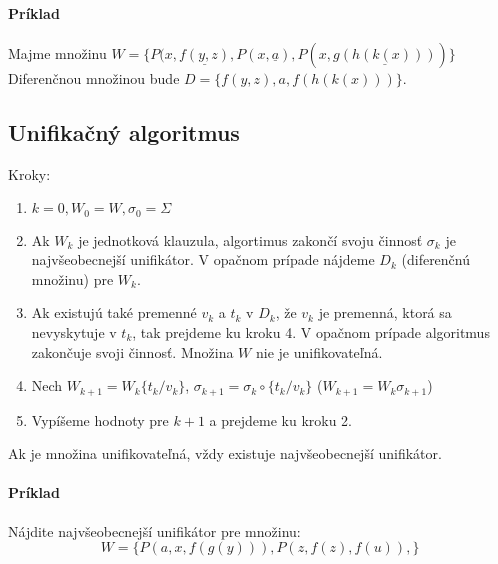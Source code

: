 \paragraph{Príklad} Majme množinu $W = \{P(x,\underline{f(y,z)},
P(x,\underline{a}), P(x,\underline{g(h(k(x)))}) \}$
Diferenčnou množinou bude $D= \{ f(y,z), a, f(h(k(x)))\}$. 

\subsection{Unifikačný algoritmus}

Kroky:
\begin{enumerate}
	\item $k=0, W_0 = W, \sigma_0 = \Sigma$
	\item Ak $W_k$ je jednotková klauzula, algortimus zakončí svoju činnosť
	$\sigma_k$ je najvšeobecnejší unifikátor. V opačnom prípade nájdeme $D_k$
	(diferenčnú množinu) pre $W_k$.
	\item Ak existujú také premenné $v_k$ a $t_k$ v $D_k$, že $v_k$ je
	premenná, ktorá sa nevyskytuje v $t_k$, tak prejdeme ku kroku 4. V
	opačnom prípade algoritmus zakončuje svoji činnosť. Množina $W$ nie je
	unifikovateľná.
	\item Nech $W_{k+1} = W_k \{t_k/v_k\}$, $\sigma_{k+1} = \sigma_k \circ
	\{t_k/v_k\}$ ($W_{k+1} = W_k \sigma_{k+1}$)

	\item Vypíšeme hodnoty pre $k+1$ a prejdeme ku kroku 2.
\end{enumerate}


Ak je množina unifikovateľná, vždy existuje najvšeobecnejší unifikátor.

\paragraph{Príklad}
Nájdite najvšeobecnejší unifikátor pre množinu: $$W=\{ P(a,x,f(g(y))),
P(z,f(z),f(u)), \}$$

